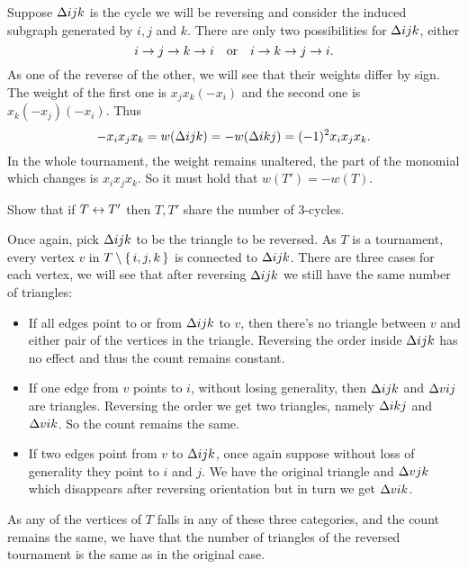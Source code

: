\documentclass[12pt]{memoir}
\begin{document}
\begin{ptcbr}
    Suppose $\Delta ijk$ is the cycle we will be reversing and consider the induced subgraph generated by $i,j$ and $k$. There are only two possibilities for $\Delta ijk$, either 
    $$i\to j\to k\to i\quad\text{or}\quad i\to k\to j\to i.$$
    As one of the reverse of the other, we will see that their weights differ by sign. The weight of the first one is $x_jx_k(-x_i)$ and the second one is $x_k(-x_j)(-x_i)$. Thus 
    $$-x_ix_jx_k=w(\Delta ijk)=-w(\Delta ikj)=(-1)^2x_ix_jx_k.$$
    In the whole tournament, the weight remains unaltered, the part of the monomial which changes is $x_ix_jx_k$. So it must hold that $w(T')=-w(T)$.
\end{ptcbr}
\newpage
\begin{Ej}
    Show that if $T\leftrightarrow T'$ then $T,T'$ share the number of 3-cycles.  
    \end{Ej}
    
\begin{ptcbr}
    Once again, pick $\Delta ijk$ to be the triangle to be reversed. As $T$ is a tournament, every vertex $v$ in $T\setminus\{\,i,j,k\,\}$ is connected to $\Delta ijk$. There are three cases for each vertex, we will see that after reversing $\Delta ijk$ we still have the same number of triangles:
    \begin{itemize}
        \itemsep=-0.4em
        \item If all edges point to or from $\Delta ijk$ to $v$, then there's no triangle between $v$ and either pair of the vertices in the triangle. Reversing the order inside $\Delta ijk$ has no effect and thus the count remains constant.
        \item If one edge from $v$ points to $i$, without losing generality, then $\Delta ijk$ and $\Delta vij$ are triangles. Reversing the order we get two triangles, namely $\Delta ikj$ and $\Delta vik$. So the count remains the same. 
        \item If two edges point from $v$ to $\Delta ijk$, once again suppose without loss of generality they point to $i$ and $j$. We have the original triangle and $\Delta vjk$ which disappears after reversing orientation but in turn we get $\Delta vik$. 
    \end{itemize}
    As any of the vertices of $T$ falls in any of these three categories, and the count remains the same, we have that the number of triangles of the reversed tournament is the same as in the original case.
\end{ptcbr}
\end{document}
